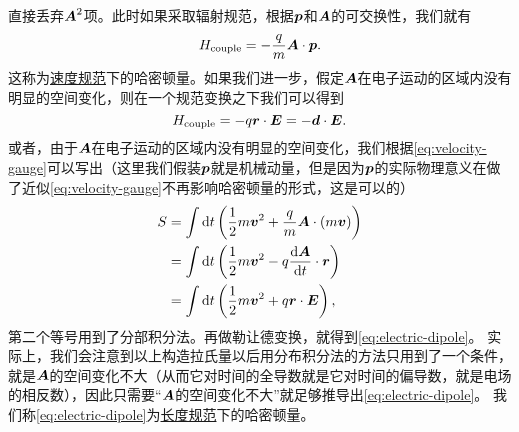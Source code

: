 \documentclass[UTF8, a4paper]{ctexart}
\newcommand{\concept}[1]{\underline{#1}}
\begin{document}
直接丢弃$\vb*{A}^2$项。此时如果采取辐射规范，根据$\vb*{p}$和$\vb*{A}$的可交换性，我们就有
\begin{equation}
    H_\text{couple} = - \frac{q}{m} \vb*{A} \cdot \vb*{p}.
    \label{eq:velocity-gauge}
\end{equation}
这称为\concept{速度规范}下的哈密顿量。如果我们进一步，假定$\vb*{A}$在电子运动的区域内没有明显的空间变化，则在一个规范变换之下我们可以得到
\begin{equation}
    H_\text{couple} = - q \vb*{r} \cdot \vb*{E} = - \vb*{d} \cdot \vb*{E}.
    \label{eq:electric-dipole}
\end{equation}
或者，由于$\vb*{A}$在电子运动的区域内没有明显的空间变化，我们根据\eqref{eq:velocity-gauge}可以写出（这里我们假装$\vb*{p}$就是机械动量，但是因为$\vb*{p}$的实际物理意义在做了近似\eqref{eq:velocity-gauge}不再影响哈密顿量的形式，这是可以的）
\[
    \begin{aligned}
        S &= \int \dd{t} \left( \frac{1}{2} m \vb*{v}^2 + \frac{q}{m} \vb*{A} \cdot (m \vb*{v}) \right) \\
        &= \int \dd{t} \left( \frac{1}{2} m \vb*{v}^2 - q \dv{\vb*{A}}{t} \cdot \vb*{r} \right) \\
        &= \int \dd{t} \left( \frac{1}{2} m \vb*{v}^2 + q \vb*{r} \cdot \vb*{E} \right),
    \end{aligned} 
\]
第二个等号用到了分部积分法。再做勒让德变换，就得到\eqref{eq:electric-dipole}。
实际上，我们会注意到以上构造拉氏量以后用分布积分法的方法只用到了一个条件，就是$\vb*{A}$的空间变化不大（从而它对时间的全导数就是它对时间的偏导数，就是电场的相反数），因此只需要“$\vb*{A}$的空间变化不大”就足够推导出\eqref{eq:electric-dipole}。
我们称\eqref{eq:electric-dipole}为\concept{长度规范}下的哈密顿量。
\end{document}
